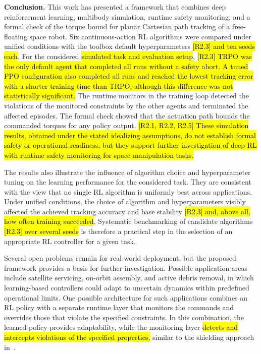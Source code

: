 \documentclass{ieeeaccess}
\newcommand{\hlone}[1]{{\sethlcolor{rone}\hl{#1}}}
\begin{document}
\textbf{Conclusion.} This work has presented a framework that combines deep reinforcement learning,
multibody simulation, runtime safety monitoring, and a formal check of the torque
bound for planar Cartesian path tracking of a free-floating space robot. Six continuous-action RL
algorithms were compared under unified conditions with the toolbox default hyperparameters
\hlone{[R2.3] and ten seeds each}. For the considered \hlone{simulated task and evaluation setup},
\hlone{[R2.3] TRPO was the only default agent that completed all runs without a safety abort. A tuned PPO
configuration also completed all runs and reached the lowest tracking error with a shorter training time
than TRPO, although this difference was not statistically significant.} The runtime monitors
in the training loop detected the violations of the monitored constraints by the other agents and
terminated the affected episodes. The formal check showed that the actuation path bounds the commanded
torques for any policy output. \hlone{[R2.1, R2.2, R2.5] These simulation results, obtained under the
stated idealizing assumptions, do not establish formal safety or operational readiness, but they support
further investigation of deep RL with runtime safety monitoring for space manipulation tasks.}

The results also illustrate the influence of algorithm choice and hyperparameter tuning on the learning
performance for the considered task. They are consistent with the view that no single RL algorithm
is uniformly best across applications. Under unified conditions, the choice of algorithm and hyperparameters
visibly affected the achieved tracking accuracy and base stability \hlone{[R2.3] and, above all, how often
training succeeded}. Systematic benchmarking of candidate algorithms \hlone{[R2.3] over several seeds} is
therefore a practical step in the selection of an appropriate RL controller for a given task.

Several open problems remain for real-world deployment, but the proposed framework provides a basis
for further investigation. Possible application areas include satellite servicing, on-orbit assembly, and active
debris removal, in which learning-based controllers could adapt to uncertain dynamics within predefined
operational limits. One possible architecture for such applications combines an RL policy with a separate runtime
layer that monitors the commands and overrides those that violate the specified constraints. In this combination,
the learned policy provides adaptability, while the monitoring layer \hlone{detects and intercepts violations of the
specified properties,} similar to the shielding approach in~\cite{b23}.
\end{document}
